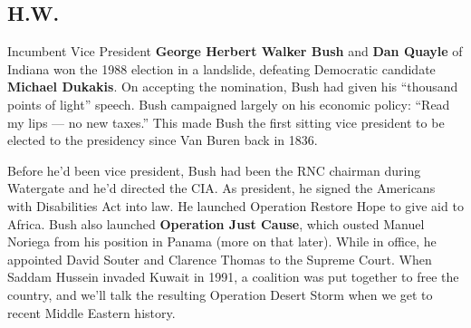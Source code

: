 \subsection*{H.W.}

Incumbent Vice President \textbf{George Herbert Walker Bush} and \textbf{Dan Quayle} of Indiana
won the 1988 election in a landslide,
defeating Democratic candidate \textbf{Michael Dukakis}.
On accepting the nomination, Bush had given his ``thousand points of light'' speech.
Bush campaigned largely on his economic policy: ``Read my lips --- no new taxes.''
This made Bush the first sitting vice president to be elected to the presidency since Van Buren back in 1836.

Before he'd been vice president, Bush had been the RNC chairman during Watergate and he'd directed the CIA\@.
As president, he signed the Americans with Disabilities Act into law.
He launched Operation Restore Hope to give aid to Africa.
Bush also launched \textbf{Operation Just Cause},
which ousted Manuel Noriega from his position in Panama (more on that later).
While in office, he appointed David Souter and Clarence Thomas to the Supreme Court.
When Saddam Hussein invaded Kuwait in 1991, a coalition was put together to free the country,
and we'll talk the resulting Operation Desert Storm when we get to recent Middle Eastern history.
